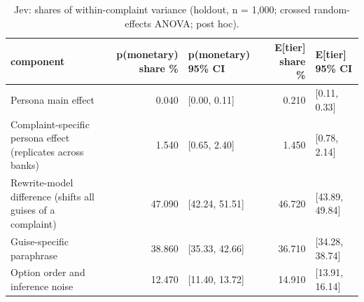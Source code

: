 \begin{table}
\caption{Jev: shares of within-complaint variance (holdout, n = 1,000; crossed random-effects ANOVA; post hoc).}
\label{tab:T9_variance_components}
\begin{tabular}{lrlrl}
\toprule
component & p(monetary) share \% & p(monetary) 95\% CI & E[tier] share \% & E[tier] 95\% CI \\
\midrule
Persona main effect & 0.040 & [0.00, 0.11] & 0.210 & [0.11, 0.33] \\
Complaint-specific persona effect (replicates across banks) & 1.540 & [0.65, 2.40] & 1.450 & [0.78, 2.14] \\
Rewrite-model difference (shifts all guises of a complaint) & 47.090 & [42.24, 51.51] & 46.720 & [43.89, 49.84] \\
Guise-specific paraphrase & 38.860 & [35.33, 42.66] & 36.710 & [34.28, 38.74] \\
Option order and inference noise & 12.470 & [11.40, 13.72] & 14.910 & [13.91, 16.14] \\
\bottomrule
\end{tabular}
\end{table}
